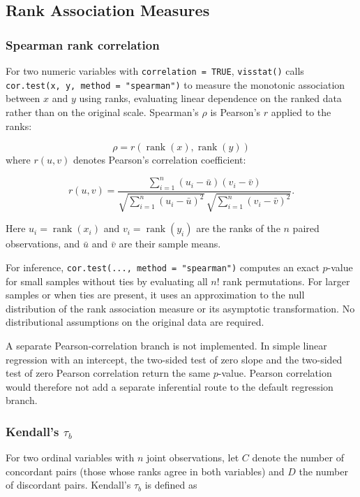 \subsection{Rank Association Measures}\label{rank-association-measures}

\subsubsection{Spearman rank correlation}\label{rho}

For two numeric variables with \texttt{correlation\ =\ TRUE}, \texttt{visstat()} calls
\texttt{cor.test(x,\ y,\ method\ =\ "spearman")} to measure the monotonic
association between \(x\) and \(y\) using ranks, evaluating linear
dependence on the ranked data rather than on the original scale.
Spearman's \(\rho\) is Pearson's \(r\) applied to the ranks:

\[\rho = r(\operatorname{rank}(x), \operatorname{rank}(y))\] where \(r(u, v)\) denotes Pearson's correlation coefficient:

\[r(u,v)
=
\frac{\sum_{i=1}^{n}(u_i-\bar u)(v_i-\bar v)}
{\sqrt{\sum_{i=1}^{n}(u_i-\bar u)^2}\,
 \sqrt{\sum_{i=1}^{n}(v_i-\bar v)^2}}.\]

Here \(u_i = \operatorname{rank}(x_i)\) and
\(v_i = \operatorname{rank}(y_i)\) are the ranks of the \(n\) paired
observations, and \(\bar{u}\) and \(\bar{v}\) are their sample means.

For inference, \texttt{cor.test(...,\ method\ =\ "spearman")} computes an exact
\(p\)-value for small samples without ties by evaluating all \(n!\) rank
permutations. For larger samples or when ties are present, it uses an
approximation to the null distribution of the rank association measure
or its asymptotic transformation. No distributional assumptions on the
original data are required.

A separate Pearson-correlation branch is not implemented. In simple
linear regression with an intercept, the two-sided test of zero slope
and the two-sided test of zero Pearson correlation return the same
\(p\)-value. Pearson correlation would therefore not add a separate
inferential route to the default regression branch.

\subsubsection{\texorpdfstring{Kendall's \(\tau_b\)}{Kendall's \textbackslash tau\_b}}\label{tau}

For two ordinal variables with \(n\) joint observations, let \(C\) denote the number of concordant pairs (those whose ranks agree in both variables) and \(D\) the number of discordant pairs.
Kendall's \(\tau_b\) is defined as

